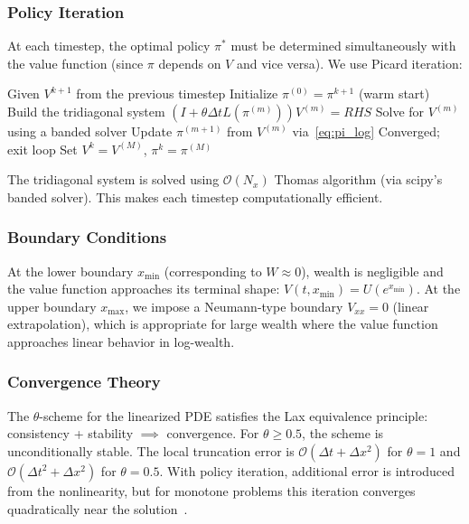 \documentclass[12pt,a4paper]{article}
\begin{document}
\subsubsection{Policy Iteration}

At each timestep, the optimal policy $\pi^*$ must be determined simultaneously with the value function (since $\pi$ depends on $V$ and vice versa). We use Picard iteration:

\begin{algorithm}[H]
\caption{Policy iteration at timestep $k$}
\label{alg:policy_iteration}
\begin{algorithmic}[1]
\State Given $V^{k+1}$ from the previous timestep
\State Initialize $\pi^{(0)} = \pi^{k+1}$ (warm start)
    \State Build the tridiagonal system $(I + \theta \Delta t L(\pi^{(m)})) V^{(m)} = RHS$
    \State Solve for $V^{(m)}$ using a banded solver
    \State Update $\pi^{(m+1)}$ from $V^{(m)}$ via~\eqref{eq:pi_log}
        \State Converged; exit loop
    \EndIf
\EndFor
\State Set $V^k = V^{(M)}$, $\pi^k = \pi^{(M)}$
\end{algorithmic}
\end{algorithm}

The tridiagonal system is solved using $\mathcal{O}(N_x)$ Thomas algorithm (via scipy's banded solver). This makes each timestep computationally efficient.

\subsubsection{Boundary Conditions}

At the lower boundary $x_{\min}$ (corresponding to $W \approx 0$), wealth is negligible and the value function approaches its terminal shape: $V(t, x_{\min}) = U(e^{x_{\min}})$. At the upper boundary $x_{\max}$, we impose a Neumann-type boundary $V_{xx} = 0$ (linear extrapolation), which is appropriate for large wealth where the value function approaches linear behavior in log-wealth.

\subsubsection{Convergence Theory}

The $\theta$-scheme for the linearized PDE satisfies the Lax equivalence principle: consistency + stability $\implies$ convergence. For $\theta \ge 0.5$, the scheme is unconditionally stable. The local truncation error is $\mathcal{O}(\Delta t + \Delta x^2)$ for $\theta = 1$ and $\mathcal{O}(\Delta t^2 + \Delta x^2)$ for $\theta = 0.5$. With policy iteration, additional error is introduced from the nonlinearity, but for monotone problems this iteration converges quadratically near the solution~\cite{kushner2001}.
\end{document}
